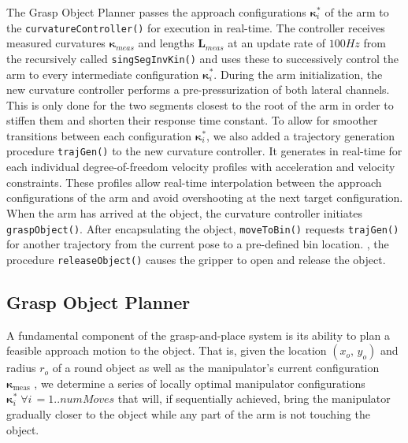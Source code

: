 The Grasp Object Planner passes the approach configurations $\boldsymbol{\kappa}_i^*$ of the arm to the \texttt{curvatureController()} for execution in real-time.
The controller receives measured curvatures $\boldsymbol{\kappa}_{meas}$ and lengths $\boldsymbol{L}_{meas}$ at an update rate of $100\unit{Hz}$ from the recursively called \texttt{singSegInvKin()} and uses these to successively control the arm to every intermediate configuration $\boldsymbol{\kappa}_i^*$.
During the arm initialization, the new curvature controller performs a pre-pressurization of both lateral channels. 
This is only done for the two segments closest to the root of the arm in order to stiffen them and shorten their response time constant.  
To allow for smoother transitions between each configuration $\boldsymbol{\kappa}_i^*$, we also added a trajectory generation procedure \texttt{trajGen()} to the new curvature controller. It generates in real-time for each individual degree-of-freedom velocity profiles with acceleration and velocity constraints.
These profiles allow real-time interpolation between the approach configurations of the arm and avoid overshooting at the next target configuration.
When the arm has arrived at the object, the curvature controller initiates \texttt{graspObject()}.
After encapsulating the object, \texttt{moveToBin()} requests \texttt{trajGen()} for another trajectory from the current pose to a pre-defined bin location.
, the procedure \texttt{releaseObject()} causes the gripper to open and release the object.

\subsection{Grasp Object Planner}
\label{subsec:grasp_planner}
A fundamental component of the grasp-and-place system is its ability to plan a feasible approach motion to the object.
That is, given the location $\left(x_o, \, y_o\right)$ and radius $r_o$ of a round object as well as the manipulator's current configuration $\boldsymbol{\kappa}_{\textrm{meas}}$ , we determine a series of locally optimal manipulator configurations $\boldsymbol{\kappa}_i^* \; \forall i \, = 1.. numMoves$ that will, if sequentially achieved, bring the manipulator gradually closer to the object while any part of the arm is not touching the object.

